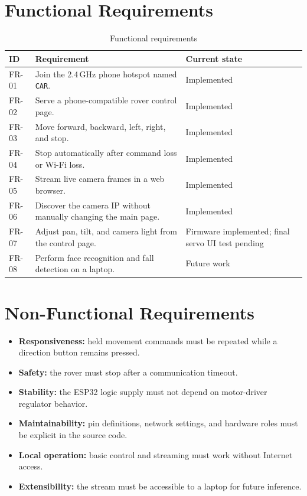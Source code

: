 \documentclass[12pt,a4paper,oneside]{report}
\newcommand{\code}[1]{\texttt{#1}}
\begin{document}
\section{Functional Requirements}
\begin{table}[H]
  \centering
  \caption{Functional requirements}
  \label{tab:functional-requirements}
  \begin{tabularx}{\textwidth}{p{1.5cm}Yp{2.4cm}}
    \toprule
    \textbf{ID} & \textbf{Requirement} & \textbf{Current state} \\
    \midrule
    FR-01 & Join the 2.4\,GHz phone hotspot named \code{CAR}. & Implemented \\
    FR-02 & Serve a phone-compatible rover control page. & Implemented \\
    FR-03 & Move forward, backward, left, right, and stop. & Implemented \\
    FR-04 & Stop automatically after command loss or Wi-Fi loss. & Implemented \\
    FR-05 & Stream live camera frames in a web browser. & Implemented \\
    FR-06 & Discover the camera IP without manually changing the main page. & Implemented \\
    FR-07 & Adjust pan, tilt, and camera light from the control page. & Firmware implemented; final servo UI test pending \\
    FR-08 & Perform face recognition and fall detection on a laptop. & Future work \\
    \bottomrule
  \end{tabularx}
\end{table}

\section{Non-Functional Requirements}
\begin{itemize}
  \item \textbf{Responsiveness:} held movement commands must be repeated while a
        direction button remains pressed.
  \item \textbf{Safety:} the rover must stop after a communication timeout.
  \item \textbf{Stability:} the ESP32 logic supply must not depend on motor-driver
        regulator behavior.
  \item \textbf{Maintainability:} pin definitions, network settings, and hardware
        roles must be explicit in the source code.
  \item \textbf{Local operation:} basic control and streaming must work without
        Internet access.
  \item \textbf{Extensibility:} the stream must be accessible to a laptop for
        future inference.
\end{itemize}
\end{document}
